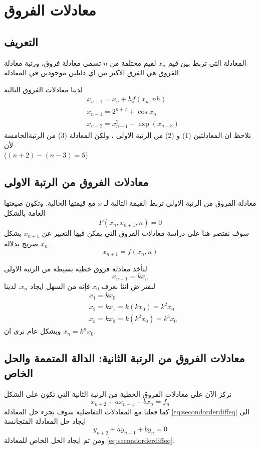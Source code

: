 \chapter{معادلات الفروق}

\section{التعريف}
المعادلة التي تربط بين قيم $x_n$ لقيم مختلفة من $n$ تسمى معادلة فروق، ورتبة معادلة الفروق هي الفرق الاكبر بين اي دليلين موجودين في المعادلة 

\begin{example}
	لدينا معادلات الفروق التالية
	\begin{align}
		& x_{n+1} = x_n + hf(x_n, nh)\\
		& x_{n+1} = 2^{n+7} + \cos x_n\\
		& x_{n+2} = x_{n+1}^2 - \exp(x_{n-3})
	\end{align}
	نلاحظ ان المعادلتين (1) و (2) من الرتبة الاولى ، ولكن المعادلة (3) من الرتبةالخامسة لأن\\
	 ($(n+2) - (n-3) = 5$)
\end{example}

\section{معادلات الفروق من الرتبة الاولى}
معادلة الفروق من الرتبة الاولى تربط القيمة التالية لـ $x$ مع قيمتها الحالية. وتكون صيغتها العامة بالشكل
\[
F(x_n, x_{n+1}, n) = 0
\]
سوف نقتصر هنا على دراسة معادلات الفروق التي يمكن فيها التعبير عن $x_{n+1}$ بشكل صريح بدلالة $x_n$. 
\[
x_{n+1} = f(x_n, n)
\]

\begin{example}
	لنأخذ معادلة فروق خطية بسيطة من الرتبة الاولى
	\[
	x_{n+1} = k x_n
	\]
	لنفتر	ض اننا نعرف $x_0$ فإنه من السهل ايجاد $x_n$. لدينا
	\begin{align*}
		& x_1 = k x_0\\
		& x_2 = k x_1 = k(kx_0) = k^2 x_0\\
		& x_3 = k x_2 = k(k^2x_0) = k^3 x_0
	\end{align*} 
	وبشكل عام نرى ان $x_n = k^n x_0$.
\end{example}

\section{معادلات الفروق من الرتبة الثانية: الدالة المتممة والحل الخاص}
نركز الآن على معادلات الفروق الخطية من الرتبة الثانية التي تكون على الشكل
\begin{equation}
	\label{eq:secondorderdiffeq}
	x_{n+2} + a x_{n+1} + b x_n = f_n
\end{equation} 
كما فعلنا مع المعادلات التفاضلية سوف نجزء حل المعادلة \eqref{eq:secondorderdiffeq} الى ايجاد حل المعادلة المتجانسة 
\[
y_{n+2} + a y_{n+1} + by_n = 0
\]
ومن ثم ايجاد الحل الخاص للمعادلة \eqref{eq:secondorderdiffeq}.

